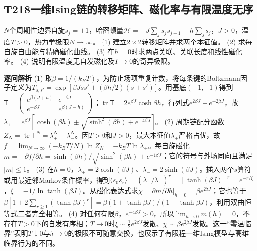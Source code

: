 \subsection*{T218\quad 一维Ising链的转移矩阵、磁化率与有限温度无序}
$N$个周期性边界自旋$s_j=\pm1$，哈密顿量$\mathcal H=-J\sum_js_js_{j+1}-h\sum_js_j$，$J>0$，温度$T>0$，热力学极限$N\to\infty$。
(1) 建立$2\times2$转移矩阵并求两个本征值。
(2) 求每自旋自由能与精确磁化曲线。
(3) 在$h=0$时求两点关联、关联长度和线性磁化率。
(4) 说明有限温度无自发磁化及$T\to0$的奇异极限。
\par\textbf{逐问解析}
(1) 取$\beta=1/(k_BT)$，为防止场项重复计数，将每条键的Boltzmann因子定义为$T_{s,s'}=\exp[\beta Jss'+(\beta h/2)(s+s')]$。用基底$(+1,-1)$得到$\mathsf T=\begin{pmatrix}e^{\beta(J+h)}&e^{-\beta J}\\e^{-\beta J}&e^{\beta(J-h)}\end{pmatrix}$；$\operatorname{tr}\mathsf T=2e^{\beta J}\cosh\beta h$，行列式$e^{2\beta J}-e^{-2\beta J}$，故$\lambda_\pm=e^{\beta J}[\cosh(\beta h)\pm\sqrt{\sinh^2(\beta h)+e^{-4\beta J}}]$。
(2) 周期链配分函数$Z_N=\operatorname{tr}\mathsf T^N=\lambda_+^N+\lambda_-^N$。因$T>0$和$J>0$，最大本征值$\lambda_+$严格占优，故$f=\lim_{N\to\infty}(-k_BT/N)\ln Z_N=-k_BT\ln\lambda_+$。每自旋磁化$m=-\partial f/\partial h=\sinh(\beta h)/\sqrt{\sinh^2(\beta h)+e^{-4\beta J}}$；它的符号与外场同向且满足$|m|\le1$。
(3) 在$h=0$，$\lambda_+=2\cosh(\beta J)$、$\lambda_-=2\sinh(\beta J)$。插入两个$s$算符或用最近邻Markov条件概率，得到$\langle s_0s_r\rangle=(\lambda_-/\lambda_+)^r=[\tanh(\beta J)]^r=e^{-r/\xi}$，$\xi=-1/\ln\tanh(\beta J)$。从磁化表达式求$\chi=\partial m/\partial h|_{h=0}=\beta e^{2\beta J}$；它也等于$\beta[1+2\sum_{r\ge1}(\tanh\beta J)^r]=\beta(1+\tanh\beta J)/(1-\tanh\beta J)$，利用双曲恒等式二者完全相等。
(4) 对任何有限$\beta$，$e^{-4\beta J}>0$，所以$\lim_{h\to0}m(h)=0$，不存在$T>0$下的自发有序相；$T\to0$时$\xi\sim\tfrac12e^{2\beta J}$发散、$\chi\sim\beta e^{2\beta J}$发散。这一“零温临界”表明$T\downarrow0$与$h\to0$的极限不可随意交换，也展示了有限程一维Ising模型与高维临界行为的不同。
\par\medskip
